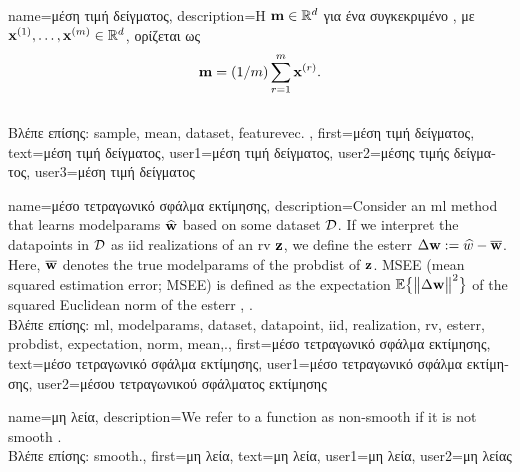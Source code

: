 {name={\foreignlanguage{greek}{μέση τιμή δείγματος}}, 
	description={\foreignlanguage{greek}{Η}    
			${\bf m} \in \mathbb{R}^{d}$ \foreignlanguage{greek}{για ένα συγκεκριμένο} , \foreignlanguage{greek}{με} 
			 ${\bf x}^{(1)},\ldots,{\bf x}^{(m)} \in \mathbb{R}^{d}$, 
			\foreignlanguage{greek}{ορίζεται ως}  
			$${\bf m} = (1/m) \sum_{r=1}^{m} {\bf x}^{(r)}.$$\\
			\foreignlanguage{greek}{Βλέπε επίσης:} \gls{sample}, \gls{mean}, \gls{dataset}, \gls{featurevec}.
		},
		first={\foreignlanguage{greek}{μέση τιμή δείγματος}},
		text={\foreignlanguage{greek}{μέση τιμή δείγματος}},
		user1={\foreignlanguage{greek}{μέση τιμή δείγματος}}, %
		user2={\foreignlanguage{greek}{μέσης τιμής δείγματος}}, %
		user3={\foreignlanguage{greek}{μέση τιμή δείγματος}} %
}

{name={\foreignlanguage{greek}{μέσο τετραγωνικό σφάλμα εκτίμησης}},
	description={Consider an \gls{ml} method that 
		learns \gls{modelparams} $\widehat{{\bf w}}$ based on some \gls{dataset} $\mathcal{D}$. 
		If we interpret the \gls{datapoint}s in $\mathcal{D}$ as \gls{iid} \gls{realization}s of an \gls{rv} ${\bf z}$, 
		we define the \gls{esterr} $\Delta {\bf w} := \widehat{w} - \overline{{\bf w}}$. 
		Here, $\overline{{\bf w}}$ denotes the true \gls{modelparams} of the \gls{probdist} 
		of ${\bf z}$. MSEE (mean squared estimation error; MSEE) is 
		defined as the \gls{expectation} $\mathbb{E} \big\{ \big\| \Delta {\bf w} \big\|^{2} \big\}$ of the 
		squared Euclidean \gls{norm} of the \gls{esterr} \cite{LC}, \cite{kay}.\\
		\foreignlanguage{greek}{Βλέπε επίσης:} \gls{ml}, \gls{modelparams}, \gls{dataset}, \gls{datapoint}, \gls{iid}, \gls{realization}, \gls{rv}, \gls{esterr}, \gls{probdist}, \gls{expectation}, \gls{norm},  \gls{mean},.},
	first={\foreignlanguage{greek}{μέσο τετραγωνικό σφάλμα εκτίμησης}},
	text={\foreignlanguage{greek}{μέσο τετραγωνικό σφάλμα εκτίμησης}},
	user1={\foreignlanguage{greek}{μέσο τετραγωνικό σφάλμα εκτίμησης}}, %
    	user2={\foreignlanguage{greek}{μέσου τετραγωνικού σφάλματος εκτίμησης}} %
}

{name={\foreignlanguage{greek}{μη λεία}},
	description={We refer to a function as non-smooth if it is not 
		\gls{smooth} \cite{nesterov04}.\\
		\foreignlanguage{greek}{Βλέπε επίσης:} \gls{smooth}.},
		first={\foreignlanguage{greek}{μη λεία}},
		text={\foreignlanguage{greek}{μη λεία}},
		user1={\foreignlanguage{greek}{μη λεία}}, %
		user2={\foreignlanguage{greek}{μη λείας}} %
}

